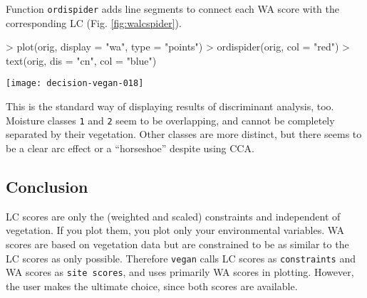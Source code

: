 \documentclass[a4paper,10pt]{amsart}
\begin{document}
Function \texttt{ordispider} adds line segments to connect each WA
score with the corresponding LC (Fig.  \ref{fig:walcspider}).
\begin{Schunk}
\begin{Sinput}
> plot(orig, display = "wa", type = "points")
> ordispider(orig, col = "red")
> text(orig, dis = "cn", col = "blue")
\end{Sinput}
\end{Schunk}
\begin{SCfigure}
\texttt{[image: decision-vegan-018]}
\caption{A ``spider plot'' connecting WA scores to corresponding LC
  scores. The shorter the web segments, the better the ordination.}
\label{fig:walcspider}
\end{SCfigure}
This is the standard way of displaying results of discriminant
analysis, too.  Moisture classes \texttt{1} and \texttt{2} seem to be
overlapping, and cannot be completely separated by their
vegetation. Other classes are more distinct, but there seems to be a
clear arc effect or a ``horseshoe'' despite using CCA.

\subsection{Conclusion}

LC scores are only the (weighted and scaled) constraints and
independent of vegetation. If you plot them, you plot only your
environmental variables. WA scores are based on vegetation data but
are constrained to be as similar to the LC scores as only
possible. Therefore \texttt{vegan} calls LC scores as
\texttt{constraints} and WA scores as \texttt{site scores}, and uses
primarily WA scores in plotting.  However, the user makes the ultimate
choice, since both scores are available.




\end{document}
